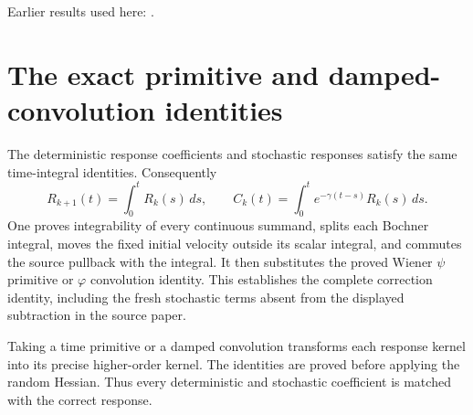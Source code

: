 \documentclass[11pt,a4paper]{article}
\begin{document}
Earlier results used here: \cite[Section~3.8.17]{LangevinLean2026ULASC}.

\section{\texorpdfstring{The exact primitive and damped-convolution identities}{The exact primitive and damped-convolution identities}}


The deterministic response coefficients and stochastic responses satisfy the same time-integral identities. Consequently \[R_{k+1}(t)=\int_0^tR_k(s)\,ds,\qquad C_k(t)=\int_0^te^{-\gamma(t-s)}R_k(s)\,ds.\] One proves integrability of every continuous summand, splits each Bochner integral, moves the fixed initial velocity outside its scalar integral, and commutes the source pullback with the integral. It then substitutes the proved Wiener \(\psi\) primitive or \(\varphi\) convolution identity. This establishes the complete correction identity, including the fresh stochastic terms absent from the displayed subtraction in the source paper.



Taking a time primitive or a damped convolution transforms each response kernel into its precise higher-order kernel. The identities are proved before applying the random Hessian. Thus every deterministic and stochastic coefficient is matched with the correct response.
\end{document}
